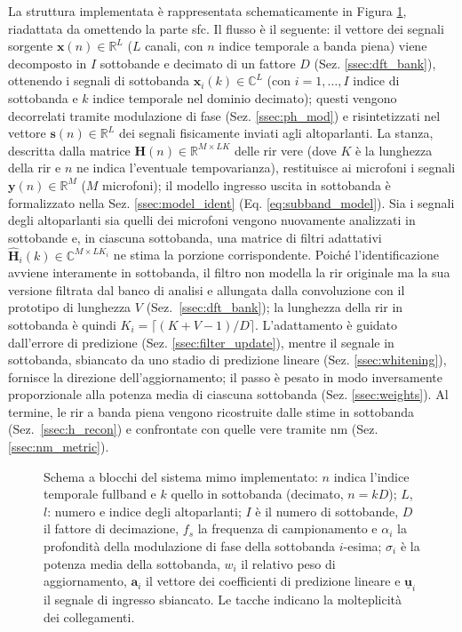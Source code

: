 \documentclass[11pt,a4paper]{article}
\begin{document}
	La struttura implementata è rappresentata schematicamente in Figura \ref{fig:mimo_diagram}, riadattata da \cite{11464373} omettendo la parte \ac{sfc}.
	Il flusso è il seguente: il vettore dei segnali sorgente $\mathbf{x}(n)\in\mathbb{R}^{L}$ ($L$ canali, con $n$ indice temporale a banda piena) viene decomposto in $I$ sottobande e decimato di un fattore $D$ (Sez. \ref{ssec:dft_bank}), ottenendo i segnali di sottobanda $\mathbf{x}_i(k) \in\mathbb{C}^L$ (con $i=1,\dots,I$ indice di sottobanda e $k$ indice temporale nel dominio decimato); questi vengono decorrelati tramite modulazione di fase (Sez. \ref{ssec:ph_mod}) e risintetizzati nel vettore $\mathbf{s}(n)\in\mathbb{R}^{L}$ dei segnali fisicamente inviati agli altoparlanti.
	La stanza, descritta dalla matrice $\mathbf{H}(n)\in\mathbb{R}^{M\times LK}$ delle \ac{rir} vere (dove $K$ è la lunghezza della \ac{rir} e $n$ ne indica l'eventuale tempovarianza), restituisce ai microfoni i segnali $\mathbf{y}(n)\in\mathbb{R}^{M}$ ($M$ microfoni); il modello ingresso uscita in sottobanda è formalizzato nella Sez. \ref{ssec:model_ident} (Eq. \ref{eq:subband_model}).
	Sia i segnali degli altoparlanti sia quelli dei microfoni vengono nuovamente analizzati in sottobande e, in ciascuna sottobanda, una matrice di filtri adattativi $\hat{\mathbf{H}}_i(k)\in\mathbb{C}^{M\times LK_i}$ ne stima la porzione corrispondente. Poiché l'identificazione avviene interamente in sottobanda, il filtro non modella la \ac{rir} originale ma la sua versione filtrata dal banco di analisi e allungata dalla convoluzione con il prototipo di lunghezza $V$ (Sez.~\ref{ssec:dft_bank}); la lunghezza della \ac{rir} in sottobanda è quindi $K_i=\lceil (K+V-1)/D\rceil$.
	L'adattamento è guidato dall'errore di predizione (Sez. \ref{ssec:filter_update}), mentre il segnale in sottobanda, sbiancato da uno stadio di predizione lineare (Sez. \ref{ssec:whitening}), fornisce la direzione dell'aggiornamento; il passo è pesato in modo inversamente proporzionale alla potenza media di ciascuna sottobanda (Sez. \ref{ssec:weights}).
	Al termine, le \ac{rir} a banda piena vengono ricostruite dalle stime in sottobanda (Sez.~\ref{ssec:h_recon}) e confrontate con quelle vere tramite \ac{nm} (Sez. \ref{ssec:nm_metric}).

	\begin{figure}[H]
		\centering
		
		\caption{Schema a blocchi del sistema \ac{mimo} implementato: $n$ indica l'indice temporale fullband e $k$ quello in sottobanda (decimato, $n = kD$); $L$, $l$: numero e indice degli altoparlanti; $I$ è il numero di sottobande, $D$ il fattore di decimazione, $f_s$ la frequenza di campionamento e $\alpha_i$ la profondità della modulazione di fase della sottobanda $i$-esima; $\sigma_i$ è la potenza media della sottobanda, $w_i$ il relativo peso di aggiornamento, $\mathbf{a}_i$ il vettore dei coefficienti di predizione lineare e $\underline{\mathbf{u}}_i$ il segnale di ingresso sbiancato. Le tacche indicano la molteplicità dei collegamenti.}
		\label{fig:mimo_diagram}
	\end{figure}
\end{document}
